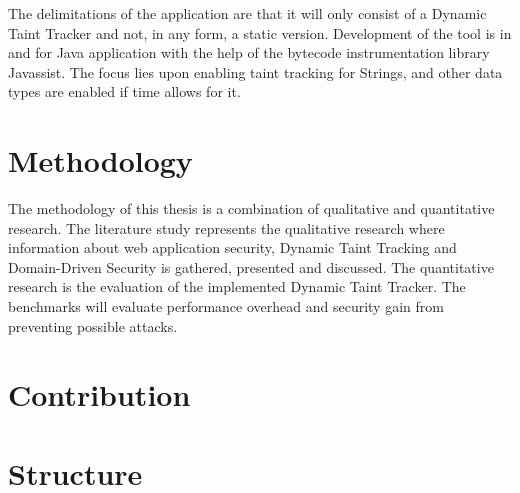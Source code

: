 The delimitations of the application are that it will only consist of a Dynamic Taint Tracker and not, in any form, a static version. Development of the tool is in and for Java application with the help of the bytecode instrumentation library Javassist. The focus lies upon enabling taint tracking for Strings, and other data types are enabled if time allows for it.



\section{Methodology}
\label{Methodology}

The methodology of this thesis is a combination of qualitative and quantitative research. The literature study represents the qualitative research where information about web application security, Dynamic Taint Tracking and Domain-Driven Security is gathered, presented and discussed. The quantitative research is the evaluation of the implemented Dynamic Taint Tracker. The benchmarks will evaluate performance overhead and security gain from preventing possible attacks.



\section{Contribution}
\label{Contribution}



\section{Structure}
\label{Structure}
